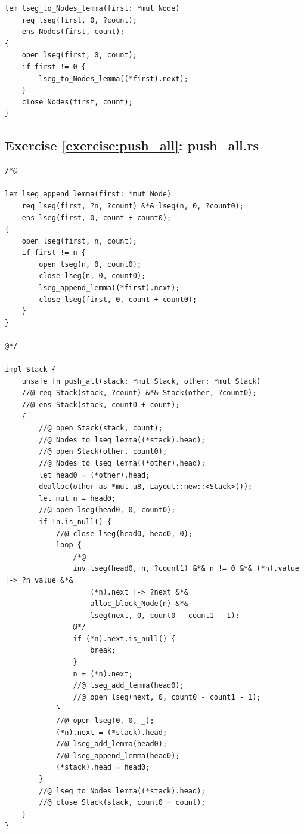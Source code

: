 \documentclass{article}
\begin{document}
\begin{lstlisting}
lem lseg_to_Nodes_lemma(first: *mut Node)
    req lseg(first, 0, ?count);
    ens Nodes(first, count);
{
    open lseg(first, 0, count);
    if first != 0 {
        lseg_to_Nodes_lemma((*first).next);
    }
    close Nodes(first, count);
}
\end{lstlisting}

\subsection{Exercise
\ref{exercise:push_all}: push\_all.rs}\label{solution:push_all}

\begin{lstlisting}
/*@

lem lseg_append_lemma(first: *mut Node)
    req lseg(first, ?n, ?count) &*& lseg(n, 0, ?count0);
    ens lseg(first, 0, count + count0);
{
    open lseg(first, n, count);
    if first != n {
        open lseg(n, 0, count0);
        close lseg(n, 0, count0);
        lseg_append_lemma((*first).next);
        close lseg(first, 0, count + count0);
    }
}

@*/

impl Stack {
    unsafe fn push_all(stack: *mut Stack, other: *mut Stack)
    //@ req Stack(stack, ?count) &*& Stack(other, ?count0);
    //@ ens Stack(stack, count0 + count);
    {
        //@ open Stack(stack, count);
        //@ Nodes_to_lseg_lemma((*stack).head);
        //@ open Stack(other, count0);
        //@ Nodes_to_lseg_lemma((*other).head);
        let head0 = (*other).head;
        dealloc(other as *mut u8, Layout::new::<Stack>());
        let mut n = head0;
        //@ open lseg(head0, 0, count0);
        if !n.is_null() {
            //@ close lseg(head0, head0, 0);
            loop {
                /*@
                inv lseg(head0, n, ?count1) &*& n != 0 &*& (*n).value |-> ?n_value &*& 
                    (*n).next |-> ?next &*&
                    alloc_block_Node(n) &*&
                    lseg(next, 0, count0 - count1 - 1);
                @*/
                if (*n).next.is_null() {
                    break;
                }
                n = (*n).next;
                //@ lseg_add_lemma(head0);
                //@ open lseg(next, 0, count0 - count1 - 1);
            }
            //@ open lseg(0, 0, _);
            (*n).next = (*stack).head;
            //@ lseg_add_lemma(head0);
            //@ lseg_append_lemma(head0);
            (*stack).head = head0;
        }
        //@ lseg_to_Nodes_lemma((*stack).head);
        //@ close Stack(stack, count0 + count);
    }
}
\end{lstlisting}
\end{document}
